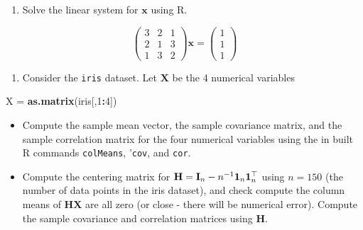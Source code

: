 \documentclass[]{book}
\newenvironment{Shaded}{\begin{snugshade}}{\end{snugshade}}
\newcommand{\CommentTok}[1]{\textcolor[rgb]{0.56,0.35,0.01}{\textit{#1}}}
\newcommand{\DecValTok}[1]{\textcolor[rgb]{0.00,0.00,0.81}{#1}}
\newcommand{\KeywordTok}[1]{\textcolor[rgb]{0.13,0.29,0.53}{\textbf{#1}}}
\newcommand{\NormalTok}[1]{#1}
\newcommand{\OperatorTok}[1]{\textcolor[rgb]{0.81,0.36,0.00}{\textbf{#1}}}
\newcommand{\StringTok}[1]{\textcolor[rgb]{0.31,0.60,0.02}{#1}}
\providecommand{\tightlist}{%
  \setlength{\itemsep}{0pt}\setlength{\parskip}{0pt}}
\theoremstyle{definition}
\theoremstyle{definition}
\theoremstyle{definition}
\theoremstyle{remark}
\begin{document}
\begin{enumerate}
\def\labelenumi{\arabic{enumi}.}
\tightlist
\item
  Solve the linear system for \(\boldsymbol x\) using R.
\end{enumerate}

\[\left(\begin{array}{ccc} 3&2&1\\2&1&3\\ 1&3&2\end{array}\right) \boldsymbol x=\left(\begin{array}{c} 1\\1\\ 1\end{array}\right)\]

\begin{enumerate}
\def\labelenumi{\arabic{enumi}.}
\setcounter{enumi}{2}
\tightlist
\item
  Consider the \texttt{iris} dataset. Let \(\boldsymbol X\) be the 4 numerical variables
\end{enumerate}

\begin{Shaded}
\begin{Highlighting}[]
\NormalTok{X =}\StringTok{ }\KeywordTok{as.matrix}\NormalTok{(iris[,}\DecValTok{1}\OperatorTok{:}\DecValTok{4}\NormalTok{])}
\end{Highlighting}
\end{Shaded}

\begin{itemize}
\item
  Compute the sample mean vector, the sample covariance matrix, and the sample correlation matrix for the four numerical variables using the in built R commands \texttt{colMeans}, '\texttt{cov}, and \texttt{cor}.
\item
  Compute the centering matrix for
  \({\bf H}={\bf I}_n-n^{-1}{\bf 1}_n {\bf 1}_n^\top\)
  using \(n=150\) (the number of data points in the iris dataset), and check compute the column means of \(\boldsymbol H\boldsymbol X\) are all zero (or close - there will be numerical error). Compute the sample covariance and correlation matrices using \(\boldsymbol H\).
\end{itemize}

\begin{Shaded}
\end{Shaded}
\end{document}
